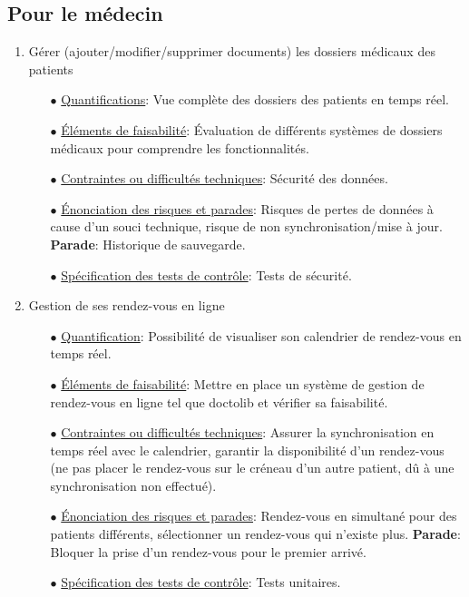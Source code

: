 \documentclass[a4paper]{report}
\begin{document}
\subsection{Pour le médecin}

\begin{enumerate}
    \item Gérer (ajouter/modifier/supprimer documents) les dossiers médicaux des patients \newline
    \begin{itemize}
        \item[$\bullet$] \underline{Quantifications}: Vue complète des dossiers des patients en temps réel.
        \item[$\bullet$] \underline{Éléments de faisabilité}: Évaluation de différents systèmes de dossiers médicaux pour comprendre les fonctionnalités.
        \item[$\bullet$] \underline{Contraintes ou difficultés techniques}: Sécurité des données.
        \item[$\bullet$] \underline{Énonciation des risques et parades}: Risques de pertes de données à cause d’un souci technique, risque de non synchronisation/mise à jour.\newline
        \textbf{Parade}: Historique de sauvegarde.
        \item[$\bullet$] \underline{Spécification des tests de contrôle}: Tests de sécurité.\newline
    \end{itemize}

    \item Gestion de ses rendez-vous en ligne\newline
    \begin{itemize}
        \item[$\bullet$] \underline{Quantification}: Possibilité de visualiser son calendrier de rendez-vous en temps réel.
        \item[$\bullet$] \underline{Éléments de faisabilité}: Mettre en place un système de gestion de rendez-vous en ligne tel que doctolib et vérifier sa faisabilité.
        \item[$\bullet$] \underline{Contraintes ou difficultés techniques}: Assurer la synchronisation en temps réel avec le calendrier, garantir la disponibilité d’un rendez-vous 
        (ne pas placer le rendez-vous sur le créneau d’un autre patient, dû à une synchronisation non effectué).
        \item[$\bullet$] \underline{Énonciation des risques et parades}: Rendez-vous en simultané pour des patients différents, sélectionner un rendez-vous qui n'existe plus.\newline
        \textbf{Parade}:  Bloquer la prise d’un rendez-vous pour le premier arrivé.
        \item[$\bullet$] \underline{Spécification des tests de contrôle}: Tests unitaires. \newline
    \end{itemize}


\end{enumerate}
\end{document}
